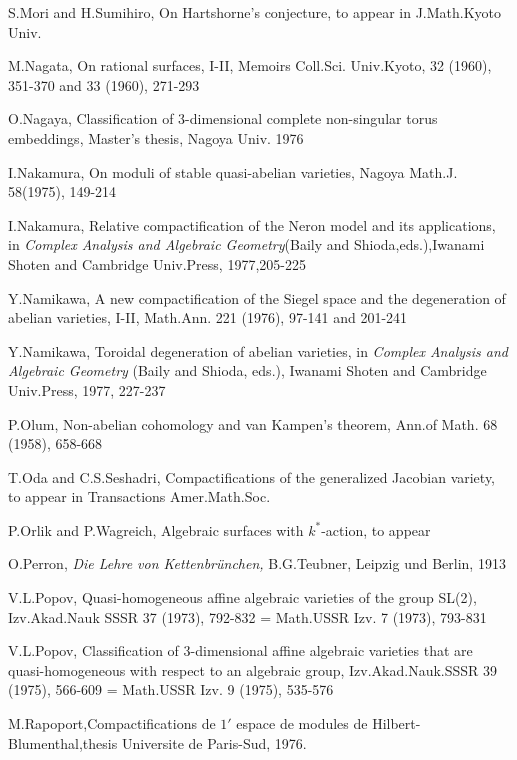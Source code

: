 \begin{thebibliography}{99}
 {S.Mori and H.Sumihiro,} On Hartshorne's conjecture, to
  appear in J.Math.Kyoto Univ. 

 {M.Nagata,} On rational surfaces, I-II, Memoirs
  Coll.Sci. Univ.Kyoto, 32 (1960), 351-370 and 33 (1960), 271-293 

 {O.Nagaya,} Classification of 3-dimensional complete
  non-singular torus embeddings, Master's thesis, Nagoya Univ. 1976
 
 {I.Nakamura,} On moduli of stable quasi-abelian varieties,
  Nagoya Math.J. 58(1975), 149-214

 {I.Nakamura,} Relative compactification of the Neron model
  and its applications, in \textit{Complex Analysis and Algebraic
    Geometry}\pageoriginale (Baily and Shioda,eds.),Iwanami Shoten and
  Cambridge   Univ.Press, 1977,205-225 

 {Y.Namikawa,} A new compactification of the Siegel space
  and the degeneration of abelian varieties, I-II,
  Math.Ann. 221 (1976), 97-141 and 201-241

 {Y.Namikawa,} Toroidal degeneration of abelian varieties,
  in  \textit{Complex Analysis and Algebraic Geometry} (Baily and
  Shioda, eds.), Iwanami Shoten and Cambridge
  Univ.Press, 1977, 227-237

 {P.Olum,} Non-abelian cohomology and van Kampen's theorem,
  Ann.of Math.  68 (1958), 658-668

 {T.Oda and C.S.Seshadri,} Compactifications of the
  generalized Jacobian variety, to appear in Transactions
  Amer.Math.Soc.

 {P.Orlik and P.Wagreich,} Algebraic surfaces with
  $k^*$-action, to appear

 {O.Perron,} \textit{Die Lehre von Kettenbr\"unchen, }
  B.G.Teubner, Leipzig und Berlin, 1913

 {V.L.Popov,} Quasi-homogeneous affine algebraic
  varieties of the group SL(2), Izv.Akad.Nauk SSSR
  37 (1973), 792-832 = Math.USSR Izv. 7 (1973), 793-831

 {V.L.Popov,} Classification of 3-dimensional affine
  algebraic varieties that are quasi-homogeneous with respect to an
  algebraic group, Izv.Akad.Nauk.SSSR 39 (1975), 566-609 = Math.USSR
  Izv. 9 (1975), 535-576

 {M.Rapoport,}\pageoriginale Compactifications de $1'$
  espace de modules de Hilbert-Blumenthal,thesis Universite de
  Paris-Sud, 1976. 


\end{thebibliography}
